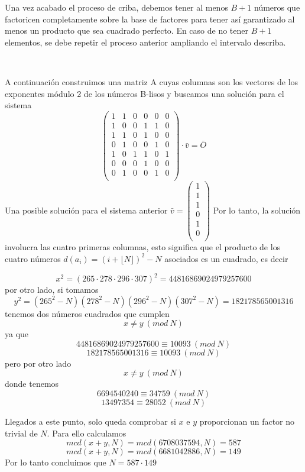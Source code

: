 \documentclass[11pt, conference]{IEEEtran}
\begin{document}
Una vez acabado el proceso de criba, debemos tener al menos $B+1$ números que factoricen completamente sobre la base de factores para tener así garantizado al menos un producto que sea cuadrado perfecto. En caso de no tener $B + 1$ elementos, se debe repetir el proceso anterior ampliando el intervalo describa.

\

A continuación construimos una matriz A cuyas columnas son los vectores de los exponentes módulo 2 de los números B-lisos y buscamos una solución para el sistema
\[
\left(
\begin{array}{cccccc}
1 & 1 & 0 & 0 & 0 & 0 \\
1 & 0 & 0 & 1 & 1 & 0 \\
1 & 1 & 0 & 1 & 0 & 0 \\
0 & 1 & 0 & 0 & 1 & 0 \\
1 & 0 & 1 & 1 & 0 & 1 \\
0 & 0 & 0 & 1 & 0 & 0 \\
0 & 1 & 0 & 0 & 1 & 0 \\
\end{array}
\right)
\cdot \bar{v}=\bar{O}
\]
Una posible solución para el sistema anterior $\bar{v} = \left(
\begin{array}{c}
1\\
1\\
1\\
0\\
1\\
0\\
\end{array}
\right)$
Por lo tanto, la solución involucra las cuatro primeras columnas, esto significa que el producto de los cuatro números $d(a_i) = (i+\lfloor N\rfloor)^2 - N$ asociados
es un cuadrado, es decir

\[
x^2=(265\cdot278\cdot296\cdot307)^2=44816869024979257600
\]
por otro lado, si tomamos
\[
	y^2=(265^2-N)(278^2-N)(296^2-N)(307^2-N) = 182178565001316
\]
tenemos dos números cuadrados que cumplen
\[x\neq y\ (mod\ N)\]
ya que
\[
44816869024979257600\equiv10093\ (mod\ N)
\]
\[
182178565001316\equiv10093\ (mod\ N)
\]
pero por otro lado
\[x\neq y\ (mod\ N)\]
donde tenemos
\[
6694540240\equiv34759\ (mod\ N)
\]
\[
13497354\equiv28052\ (mod\ N)
\]

Llegados a este punto, solo queda comprobar si $x$ e $y$ proporcionan un factor no trivial de $N$. Para ello calculamos
\[
mcd(x+y, N) = mcd(6708037594,N) = 587
\]
\[
mcd(x+y, N) = mcd(6681042886,N) = 149
\]
Por lo tanto concluimos que $N=587\cdot149$
\end{document}
